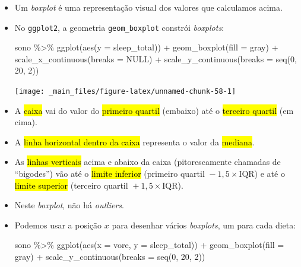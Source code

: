 \documentclass[
  11pt]{report}
\newenvironment{Shaded}{\begin{snugshade}}{\end{snugshade}}
\newcommand{\AttributeTok}[1]{\textcolor[rgb]{0.77,0.63,0.00}{#1}}
\newcommand{\ConstantTok}[1]{\textcolor[rgb]{0.00,0.00,0.00}{#1}}
\newcommand{\DecValTok}[1]{\textcolor[rgb]{0.00,0.00,0.81}{#1}}
\newcommand{\FunctionTok}[1]{\textcolor[rgb]{0.00,0.00,0.00}{#1}}
\newcommand{\NormalTok}[1]{#1}
\newcommand{\SpecialCharTok}[1]{\textcolor[rgb]{0.00,0.00,0.00}{#1}}
\newcommand{\StringTok}[1]{\textcolor[rgb]{0.31,0.60,0.02}{#1}}
\renewenvironment{Shaded}{
  \begin{mdframed}[%
    roundcorner=2pt,%
    innerleftmargin=5pt,%
    innerrightmargin=5pt,%
    topline=true,%
    leftline=true,%
    rightline=true,%
    bottomline=true,%
    linewidth=0.5pt,%
    linecolor=black!20,%
    backgroundcolor=black!2,%
    skipabove=2ex,%
    skipbelow=2.5ex%
  ]%
}
{
  \end{mdframed}
}
\begin{document}
\begin{itemize}
\item
  Um \emph{boxplot} é uma representação visual dos valores que calculamos acima.
\item
  No \texttt{ggplot2}, a geometria \texttt{geom\_boxplot} constrói \emph{boxplots}:

\begin{Shaded}
\begin{Highlighting}[]
\NormalTok{sono }\SpecialCharTok{\%\textgreater{}\%} 
  \FunctionTok{ggplot}\NormalTok{(}\FunctionTok{aes}\NormalTok{(}\AttributeTok{y =}\NormalTok{ sleep\_total)) }\SpecialCharTok{+}
    \FunctionTok{geom\_boxplot}\NormalTok{(}\AttributeTok{fill =} \StringTok{\textquotesingle{}gray\textquotesingle{}}\NormalTok{) }\SpecialCharTok{+}
    \FunctionTok{scale\_x\_continuous}\NormalTok{(}\AttributeTok{breaks =} \ConstantTok{NULL}\NormalTok{) }\SpecialCharTok{+}
    \FunctionTok{scale\_y\_continuous}\NormalTok{(}\AttributeTok{breaks =} \FunctionTok{seq}\NormalTok{(}\DecValTok{0}\NormalTok{, }\DecValTok{20}\NormalTok{, }\DecValTok{2}\NormalTok{))}
\end{Highlighting}
\end{Shaded}

  \begin{center}\texttt{[image: \_main\_files/figure-latex/unnamed-chunk-58-1]} \end{center}
\item
  A {\hl{caixa}} vai do valor do {\hl{primeiro quartil}} (embaixo) até o {\hl{terceiro quartil}} (em cima).
\item
  A {\hl{linha horizontal dentro da caixa}} representa o valor da {\hl{mediana}}.
\item
  As {\hl{linhas verticais}} acima e abaixo da caixa (pitorescamente chamadas de ``bigodes'') vão até o {\hl{limite inferior}} (primeiro quartil ${}- 1{,}5 \times \text{IQR}$) e até o {\hl{limite superior}} (terceiro quartil ${}+ 1{,}5 \times \text{IQR}$).
\item
  Neste \emph{boxplot}, não há \emph{outliers}.
\item
  Podemos usar a posição $x$ para desenhar vários \emph{boxplots}, um para cada dieta:

\begin{Shaded}
\begin{Highlighting}[]
\NormalTok{sono }\SpecialCharTok{\%\textgreater{}\%} 
  \FunctionTok{ggplot}\NormalTok{(}\FunctionTok{aes}\NormalTok{(}\AttributeTok{x =}\NormalTok{ vore, }\AttributeTok{y =}\NormalTok{ sleep\_total)) }\SpecialCharTok{+}
    \FunctionTok{geom\_boxplot}\NormalTok{(}\AttributeTok{fill =} \StringTok{\textquotesingle{}gray\textquotesingle{}}\NormalTok{) }\SpecialCharTok{+}
    \FunctionTok{scale\_y\_continuous}\NormalTok{(}\AttributeTok{breaks =} \FunctionTok{seq}\NormalTok{(}\DecValTok{0}\NormalTok{, }\DecValTok{20}\NormalTok{, }\DecValTok{2}\NormalTok{))}
\end{Highlighting}
\end{Shaded}


\end{itemize}
\end{document}
